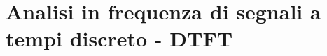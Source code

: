 \documentclass[../main.tex]{subfiles}
\begin{document}



\clearpage
\thispagestyle{empty}
\vspace*{7cm}
\section{Analisi in frequenza di segnali a tempi discreto - DTFT}
\vspace*{1.5cm}


\end{document}
